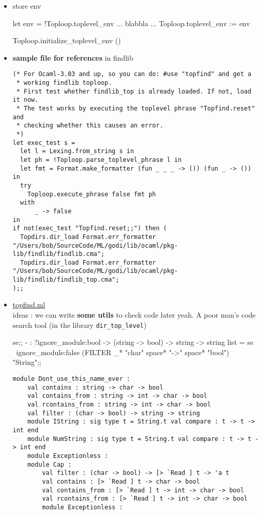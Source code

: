 \begin{enumerate}
\begin{itemize}
\item store env

  \begin{bluecode}
let env = !Toploop.toplevel_env
... blabbla ...     
Toploop.toplevel_env := env     
\end{bluecode}
\begin{bluecode}
Toploop.initialize_toplevel_env ()  
\end{bluecode}
  \item \textbf{sample file  for references } in findlib


\begin{lstlisting}[caption=Toplevel Code Sample,label=toplevel]
(* For Ocaml-3.03 and up, so you can do: #use "topfind" and get a
 * working findlib toploop.
 * First test whether findlib_top is already loaded. If not, load it now.
 * The test works by executing the toplevel phrase "Topfind.reset" and
 * checking whether this causes an error.
 *)
let exec_test s =
  let l = Lexing.from_string s in
  let ph = !Toploop.parse_toplevel_phrase l in
  let fmt = Format.make_formatter (fun _ _ _ -> ()) (fun _ -> ()) in
  try
    Toploop.execute_phrase false fmt ph
  with
      _ -> false
in
if not(exec_test "Topfind.reset;;") then (
  Topdirs.dir_load Format.err_formatter "/Users/bob/SourceCode/ML/godi/lib/ocaml/pkg-lib/findlib/findlib.cma";
  Topdirs.dir_load Format.err_formatter "/Users/bob/SourceCode/ML/godi/lib/ocaml/pkg-lib/findlib/findlib_top.cma";
);;
\end{lstlisting}

    
  \item \href{file:/Users/bob/SourceCode/ML/godi/build/distfiles/findlib-1.2.7/src/findlib/topfind.ml}{topfind.ml} \\
    ideas : we can write \textbf{some utils} to check code later 
    yeah. A poor man's code search tool (in the library \verb|dir_top_level|)


\begin{alternate}
se;;
- : ?ignore_module:bool -> (string -> bool) -> string -> string list =
se ~ignore_module:false (FILTER _*  "char" space* "->" space* "bool") "String";;
\end{alternate}

\begin{lstlisting}
module Dont_use_this_name_ever :
    val contains : string -> char -> bool
    val contains_from : string -> int -> char -> bool
    val rcontains_from : string -> int -> char -> bool
    val filter : (char -> bool) -> string -> string
    module IString : sig type t = String.t val compare : t -> t -> int end
    module NumString : sig type t = String.t val compare : t -> t -> int end
    module Exceptionless :
    module Cap :
        val filter : (char -> bool) -> [> `Read ] t -> 'a t
        val contains : [> `Read ] t -> char -> bool
        val contains_from : [> `Read ] t -> int -> char -> bool
        val rcontains_from : [> `Read ] t -> int -> char -> bool
        module Exceptionless :
\end{lstlisting}



\end{itemize}
\end{enumerate}
